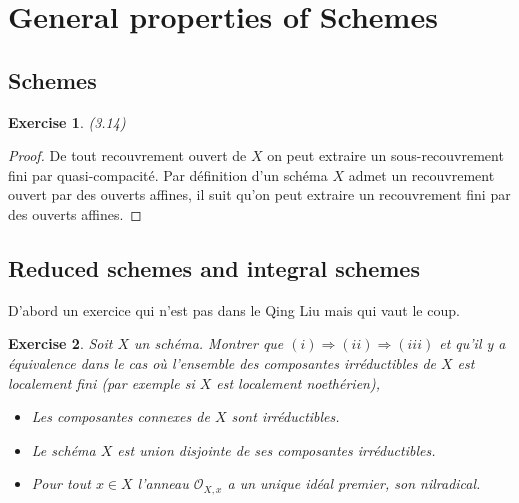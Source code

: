 \documentclass[A4, 11pt]{article}
\newtheorem{exer}{Exercise}
\begin{document}
\section{General properties of Schemes}
\subsection{Schemes}
\begin{exer}(3.14)
\end{exer}
\begin{proof}
De tout recouvrement ouvert de $X$ on peut extraire un sous-recouvrement fini par quasi-compacité. Par définition d'un schéma $X$ admet un recouvrement ouvert par des ouverts affines, il suit qu'on peut extraire un recouvrement fini par des ouverts affines.
\end{proof}
\subsection{Reduced schemes and integral schemes}
D'abord un exercice qui n'est pas dans le Qing Liu mais qui vaut le coup.
\begin{exer} Soit $X$ un schéma. Montrer que $(i)\Rightarrow (ii)\Rightarrow (iii)$ et qu'il y a équivalence dans le cas où l'ensemble des composantes irréductibles de $X$ est localement fini (par exemple si $X$ est localement noethérien),
\begin{itemize}
\item[(i)] Les composantes connexes de $X$ sont irréductibles.
\item[(ii)] Le schéma $X$ est union disjointe de ses composantes irréductibles.
\item[(iii)] Pour tout $x\in X$ l'anneau $\mathcal{O}_{X,x}$ a un unique idéal premier, son nilradical.
\end{itemize}
\end{exer}
\end{document}
